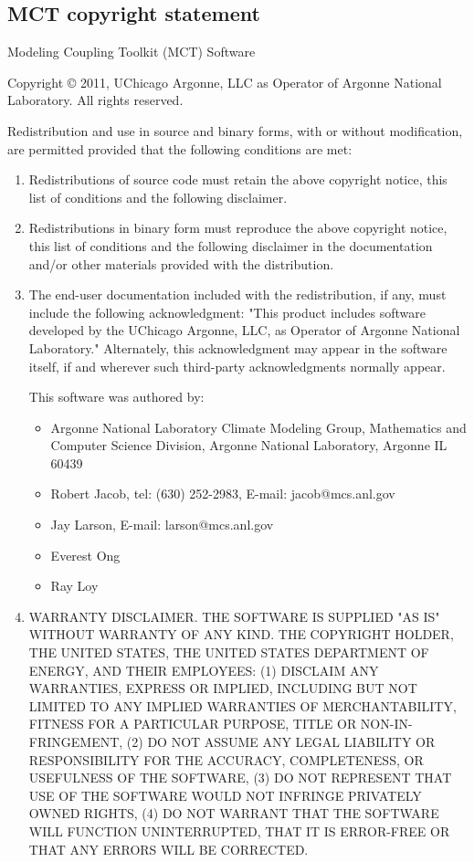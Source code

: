\subsection{MCT copyright statement}
\label{sec_MCT}

                            Modeling Coupling Toolkit (MCT) Software

Copyright © 2011, UChicago Argonne, LLC as Operator of Argonne National Laboratory. All rights reserved.

Redistribution and use in source and binary forms, with or without modification, are permitted provided that the following conditions are met:
\begin{enumerate}
\item Redistributions of source code must retain the above copyright notice, this list of conditions and the following disclaimer.
\item Redistributions in binary form must reproduce the above copyright notice, this list of conditions and the following disclaimer in the documentation and/or other materials provided with the distribution.
\item The end-user documentation included with the redistribution, if any, must include the following acknowledgment: "This product includes software developed by the UChicago Argonne, LLC, as Operator of Argonne National Laboratory." Alternately, this acknowledgment may appear in the software itself, if and wherever such third-party acknowledgments normally appear.

This software was authored by:
\begin{itemize}
\item Argonne National Laboratory Climate Modeling Group, Mathematics and Computer Science Division, Argonne National Laboratory, Argonne IL 60439
\item Robert Jacob, tel: (630) 252-2983, E-mail: jacob@mcs.anl.gov
\item Jay Larson, E-mail: larson@mcs.anl.gov
\item Everest Ong
\item Ray Loy
\end{itemize}

\item WARRANTY DISCLAIMER. THE SOFTWARE IS SUPPLIED "AS IS" WITHOUT WARRANTY OF ANY KIND. THE COPYRIGHT HOLDER, THE UNITED STATES, THE UNITED STATES DEPARTMENT OF ENERGY, AND THEIR EMPLOYEES: (1) DISCLAIM ANY WARRANTIES, EXPRESS OR IMPLIED, INCLUDING BUT NOT LIMITED TO ANY IMPLIED WARRANTIES OF MERCHANTABILITY, FITNESS FOR A PARTICULAR PURPOSE, TITLE OR NON-IN- FRINGEMENT, (2) DO NOT ASSUME ANY LEGAL LIABILITY OR RESPONSIBILITY FOR THE ACCURACY, COMPLETENESS, OR USEFULNESS OF THE SOFTWARE, (3) DO NOT REPRESENT THAT USE OF THE SOFTWARE WOULD NOT INFRINGE PRIVATELY OWNED RIGHTS, (4) DO NOT WARRANT THAT THE SOFTWARE WILL FUNCTION UNINTERRUPTED, THAT IT IS ERROR-FREE OR THAT ANY ERRORS WILL BE CORRECTED. 


\end{enumerate}
